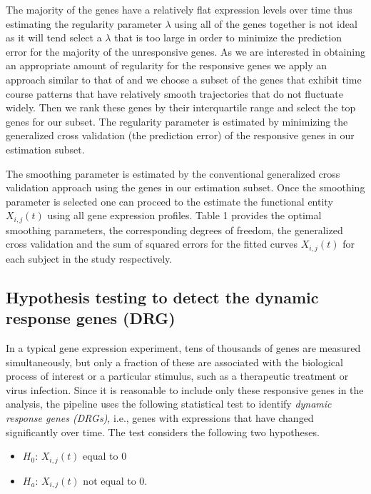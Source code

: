 The majority of the genes have a relatively flat expression levels over time thus estimating the regularity parameter $\lambda$ using all of the genes together is not ideal as it will tend select a $\lambda$ that is too large in order to minimize the prediction error for the majority of the unresponsive genes. As we are interested in obtaining an appropriate amount of regularity for the responsive genes we apply an approach similar to that of \cite{yao2005functional} and \cite{wu2013more} we choose a subset of the genes that exhibit time course patterns that have relatively smooth trajectories that do not fluctuate widely. Then we rank these genes by their interquartile range and select the top genes for our subset. The regularity parameter is estimated by minimizing the generalized cross validation (the prediction error) of the responsive genes in our estimation subset.

The smoothing parameter is estimated by the conventional generalized cross validation approach using the genes in our estimation subset. Once the smoothing parameter is selected one can proceed to the estimate the functional entity $X_{i,j}(t)$ using all gene expression profiles. Table 1 provides the optimal smoothing parameters, the corresponding degrees of freedom, the generalized cross validation and the sum of squared errors for the fitted curves $X_{i,j}(t)$ for each subject in the study respectively.

\subsection{Hypothesis testing to detect the dynamic response genes (DRG)}

\par In a typical gene expression experiment, tens of thousands of genes are measured simultaneously, but only a fraction of these are associated with the biological process of interest or a particular stimulus, such as a therapeutic treatment or virus infection. Since it is reasonable to include only these responsive genes in the analysis, the pipeline uses the following statistical test to identify \emph{dynamic response genes (DRGs)}, i.e., genes with expressions that have changed significantly over time. The test considers the following two hypotheses.


\begin{itemize}

\item $H_{0}$: $X_{i,j}(t)$ equal to $0$

\item $H_{a}$: $X_{i,j}(t)$ not equal to $0$.

\end{itemize}

